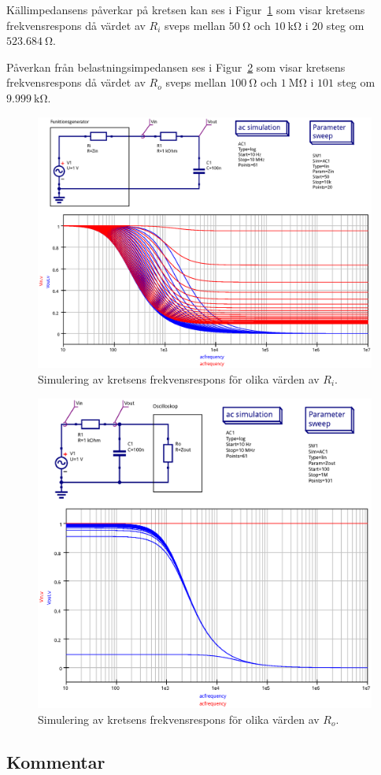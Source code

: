 Källimpedansens påverkar på kretsen kan ses i Figur~\ref{fig:Zin-step} som
visar kretsens frekvensrespons då värdet av $R_i$ sveps mellan $\SI{50}{\ohm}$
och $\SI{10}{\kohm}$ i $20$ steg om $\SI{523.684}{\ohm}$.

Påverkan från belastningsimpedansen ses i Figur~\ref{fig:Zout-step} som visar
kretsens frekvensrespons då värdet av $R_o$ sveps mellan $\SI{100}{\ohm}$ och
$\SI{1}{\mega\ohm}$ i $101$ steg om $\SI{9.999}{\kohm}$.


\begin{figure}[ht]\label{fig:Zin-step}
  \centering
  \includegraphics[width=\linewidth]{sim/ee466_lab-4_prj/uppgift-3_Zin_step}
  \caption[] {Simulering av kretsens frekvensrespons för olika värden av $R_i$.}
\end{figure}

\begin{figure}[ht]\label{fig:Zout-step}
  \centering
  \includegraphics[width=\linewidth]{sim/ee466_lab-4_prj/uppgift-3_Zout_step}
  \caption[] {Simulering av kretsens frekvensrespons för olika värden av $R_o$.}
\end{figure}

\subsection{Kommentar}\label{}


